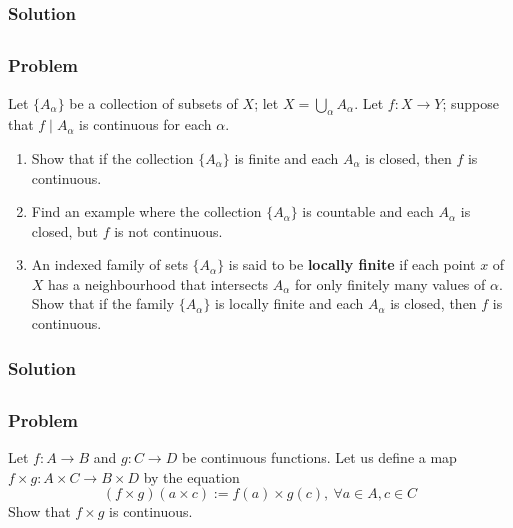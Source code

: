 \subsubsection{Solution}
\todo


\subsection{}

\subsubsection{Problem}
Let $\{ A_\alpha \}$ be a collection of subsets of $X$; let $X = \bigcup_\alpha A_\alpha$. Let $f : X \to Y$; suppose that $f \mid A_\alpha$ is continuous for each $\alpha$.
\begin{enumerate}
    \item Show that if the collection $\{A_\alpha\}$ is finite and each $A_\alpha$ is closed, then $f$ is continuous.
    \item Find an example where the collection $\{A_\alpha\}$ is countable and each $A_\alpha$ is closed, but $f$ is not continuous.
    \item An indexed family of sets $\{A_\alpha\}$ is said to be \textbf{locally finite} if each point $x$ of $X$ has a neighbourhood that intersects $A_\alpha$ for only finitely many values of $\alpha$. Show that if the family $\{A_\alpha\}$ is locally finite and each $A_\alpha$ is closed, then $f$ is continuous.
\end{enumerate}

\subsubsection{Solution}
\todo


\subsection{}

\subsubsection{Problem}
Let $f : A \to B$ and $g : C \to D$ be continuous functions. Let us define a map $f \times g : A \times C \to B \times D$ by the equation
\[ (f \times g)(a \times c) := f(a) \times g(c),~ \forall a \in A, c \in C \]
Show that $f \times g$ is continuous.

